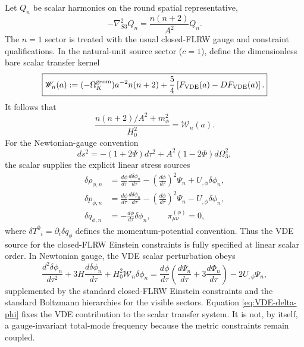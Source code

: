 \documentclass[11pt,a4paper]{article}
\def\Sthree{S3}%
\def\dd{d}%
\def\Dil{D}%
\numberwithin{equation}{section}
\theoremstyle{definition}
\theoremstyle{plain}
\theoremstyle{remark}
\newcommand{\Sthree}{S^3}
\newcommand{\Dil}{\mathscr{D}}
\newcommand{\dd}{\mathrm{d}}
\begin{document}
Let $Q_n$ be scalar harmonics on the round spatial representative,
\begin{equation}
-\nabla^2_{\Sthree}Q_n=\frac{n(n+2)}{A^2}Q_n.
\end{equation}
The $n=1$ sector is treated with the usual closed-FLRW gauge and constraint
qualifications.  In the natural-unit source sector ($c=1$), define the dimensionless bare scalar
transfer kernel
\begin{equation}
\boxed{
\mathscr W_n(a):=
(-\Omega_K^{\rm geom})a^{-2}n(n+2)
+\frac54\left[F_{\rm VDE}(a)-\Dil F_{\rm VDE}(a)\right].}
\label{eq:VDE-transfer-kernel}
\end{equation}
It follows that
\begin{equation}
\frac{n(n+2)/A^2+m_\phi^2}{H_0^2}=\mathscr W_n(a).
\end{equation}
For the Newtonian-gauge convention
\begin{equation}
\dd s^2=-(1+2\Psi)\dd\tau^2
+A^2(1-2\Phi)\dd\Omega_3^2,
\end{equation}
the scalar supplies the explicit linear stress sources
\begin{align}
\delta\rho_{\phi,n}
&=\frac{\dd\phi}{\dd\tau}\frac{\dd\delta\phi_n}{\dd\tau}
-\left(\frac{\dd\phi}{\dd\tau}\right)^2\Psi_n
+U_{,\phi}\delta\phi_n,\\
\delta p_{\phi,n}
&=\frac{\dd\phi}{\dd\tau}\frac{\dd\delta\phi_n}{\dd\tau}
-\left(\frac{\dd\phi}{\dd\tau}\right)^2\Psi_n
-U_{,\phi}\delta\phi_n,\\
\delta q_{\phi,n}&=-\frac{\dd\phi}{\dd\tau}\delta\phi_n,
\qquad
\pi^{(\phi)}_{\mu\nu}=0,
\end{align}
where $\delta T^0{}_{i}=\partial_i\delta q_\phi$ defines the momentum-potential
convention.  Thus the VDE source for the closed-FLRW Einstein constraints is
fully specified at linear scalar order.
In Newtonian gauge, the VDE scalar perturbation obeys
\begin{equation}
\frac{\dd^2\delta\phi_n}{\dd\tau^2}
+3H\frac{\dd\delta\phi_n}{\dd\tau}
+H_0^2\mathscr W_n\delta\phi_n
=\frac{\dd\phi}{\dd\tau}
\left(\frac{\dd\Psi_n}{\dd\tau}+3\frac{\dd\Phi_n}{\dd\tau}\right)
-2U_{,\phi}\Psi_n,
\label{eq:VDE-delta-phi}
\end{equation}
supplemented by the standard closed-FLRW Einstein constraints and the standard
Boltzmann hierarchies for the visible sectors.  Equation
\eqref{eq:VDE-delta-phi} fixes the VDE contribution to the scalar transfer
system.  It is not, by itself, a gauge-invariant total-mode frequency because
the metric constraints remain coupled.
\end{document}
